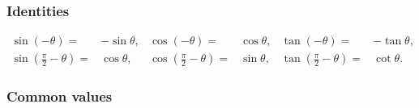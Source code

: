 \documentclass[a4paper,11pt]{article}
\begin{document}
\subsubsection{Identities}

\[
\begin{array}{rlrlrl}
{\sin( - \theta) =} & {- \sin\theta,} & {\cos( - \theta) =} & {\cos\theta,} & {\tan( - \theta) =} & {- \tan\theta,} \\
{\sin\left( \frac{\pi}{2} - \theta \right) =} & {\cos\theta,} & {\cos\left( \frac{\pi}{2} - \theta \right) =} & {\sin\theta,} & {\tan\left( \frac{\pi}{2} - \theta \right) =} & {\cot\theta.}
\end{array}
\]

\subsubsection{Common values}
\end{document}
